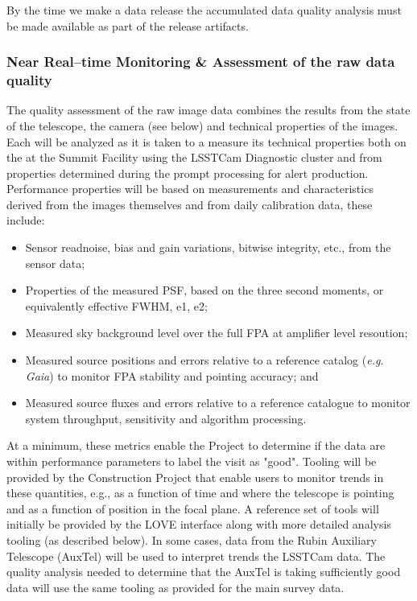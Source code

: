 By the time we make a data release the accumulated data quality analysis must be made available as part of the release artifacts.

\subsubsection{Near Real--time Monitoring \& Assessment of the raw data quality}

The quality assessment of the raw image data combines the results from the state of the telescope, the camera (see below) and technical properties of the images.  Each will be analyzed as it is taken to a measure its technical properties both on the at the Summit Facility using the LSSTCam Diagnostic cluster and from properties determined during the prompt processing for alert production.  Performance properties will be based on measurements and characteristics derived from the images themselves and from daily calibration data, these include:

\begin{itemize}

	\item Sensor readnoise, bias and gain variations, bitwise integrity, etc., from the sensor data;
	\item Properties of the measured PSF, based on the three second moments, or equivalently effective FWHM, e1, e2;
	\item Measured sky background level over the full FPA at amplifier level resoution;
	\item Measured source positions and errors relative to a reference catalog ({\it e.g. Gaia}) to monitor FPA stability and pointing accuracy; and
	\item Measured source fluxes and errors relative to a reference catalogue to monitor system throughput, sensitivity and algorithm processing.

\end{itemize}

At a minimum, these metrics enable the Project to determine if the data are within performance parameters to label the visit as "good".   Tooling will be provided by the Construction Project that enable users to monitor trends in these quantities, e.g., as a function of time and where the telescope is pointing and as a function of position in the focal plane.  A reference set of tools will initially be provided by the LOVE interface along with more detailed analysis tooling (as described below).  In some cases, data from the Rubin Auxiliary Telescope (AuxTel) will be used to interpret trends the LSSTCam data.  The quality analysis needed to determine that the AuxTel is taking sufficiently good data will use the same tooling as provided for the main survey data.

